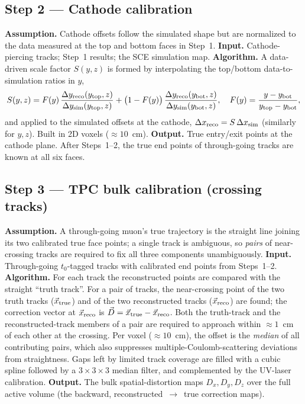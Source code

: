 \subsection{Step 2 --- Cathode calibration}
\label{ssec:sce-cathode}
\textbf{Assumption.} Cathode offsets follow the simulated shape but are
normalized to the data measured at the top and bottom faces in Step~1.
\textbf{Input.} Cathode-piercing tracks; Step~1 results; the SCE simulation map.
\textbf{Algorithm.} A data-driven scale factor $S(y,z)$ is formed by
interpolating the top/bottom data-to-simulation ratios in $y$,
\begin{equation}
S(y,z)=F(y)\,\frac{\Delta y_{\rm reco}(y_{\rm top},z)}{\Delta y_{\rm sim}(y_{\rm top},z)}
+\big(1-F(y)\big)\,\frac{\Delta y_{\rm reco}(y_{\rm bot},z)}{\Delta y_{\rm sim}(y_{\rm bot},z)},
\quad F(y)=\frac{y-y_{\rm bot}}{y_{\rm top}-y_{\rm bot}},
\end{equation}
and applied to the simulated offsets at the cathode,
$\Delta x_{\rm reco}=S\,\Delta x_{\rm sim}$ (similarly for $y,z$). Built in 2D
voxels ($\approx 10$~cm).
\textbf{Output.} True entry/exit points at the cathode plane. After Steps~1--2,
the true end points of through-going tracks are known at all six faces.

\subsection{Step 3 --- TPC bulk calibration (crossing tracks)}
\label{ssec:sce-bulk}
\textbf{Assumption.} A through-going muon's true trajectory is the straight line
joining its two calibrated true face points; a single track is ambiguous, so
\emph{pairs} of near-crossing tracks are required to fix all three components
unambiguously.
\textbf{Input.} Through-going $t_0$-tagged tracks with calibrated end points
from Steps~1--2.
\textbf{Algorithm.} For each track the reconstructed points are compared with
the straight ``truth track''. For a pair of tracks, the near-crossing point of
the two truth tracks ($\vec{x}_{\rm true}$) and of the two reconstructed tracks
($\vec{x}_{\rm reco}$) are found; the correction vector at $\vec{x}_{\rm reco}$
is $\vec{D}=\vec{x}_{\rm true}-\vec{x}_{\rm reco}$. Both the truth-track and the
reconstructed-track members of a pair are required to approach within
$\approx 1$~cm of each other at the crossing. Per voxel ($\approx 10$~cm), the
offset is the \emph{median} of all contributing pairs, which also suppresses
multiple-Coulomb-scattering deviations from straightness. Gaps left by limited
track coverage are filled with a cubic spline followed by a
$3\times3\times3$ median filter, and complemented by the UV-laser calibration.
\textbf{Output.} The bulk spatial-distortion maps $D_x,D_y,D_z$ over the full
active volume (the backward, reconstructed~$\rightarrow$~true correction maps).

